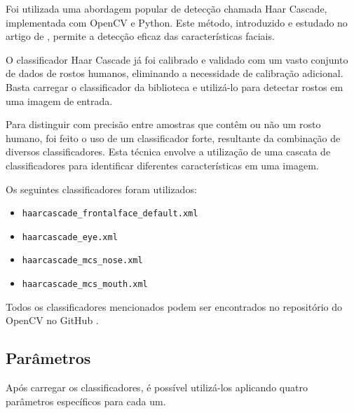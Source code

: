 Foi utilizada uma abordagem popular de detecção chamada Haar Cascade, implementada com OpenCV e Python. Este método, introduzido e estudado no artigo de \citet{BoostedCascade}, permite a detecção eficaz das características faciais.

O classificador Haar Cascade já foi calibrado e validado com um vasto conjunto de dados de rostos humanos, eliminando a necessidade de calibração adicional. Basta carregar o classificador da biblioteca e utilizá-lo para detectar rostos em uma imagem de entrada.

Para distinguir com precisão entre amostras que contêm ou não um rosto humano, foi feito o uso de um classificador forte, resultante da combinação de diversos classificadores. Esta técnica envolve a utilização de uma cascata de classificadores para identificar diferentes características em uma imagem.

Os seguintes classificadores foram utilizados:
\begin{itemize}
    \item \texttt{haarcascade\_frontalface\_default.xml}
    \item \texttt{haarcascade\_eye.xml}
    \item \texttt{haarcascade\_mcs\_nose.xml}
    \item \texttt{haarcascade\_mcs\_mouth.xml}
\end{itemize}

Todos os classificadores mencionados podem ser encontrados no repositório do OpenCV no GitHub \cite{HaarAplicacao}.

\subsection{Parâmetros}

Após carregar os classificadores, é possível utilizá-los aplicando quatro parâmetros específicos para cada um.

